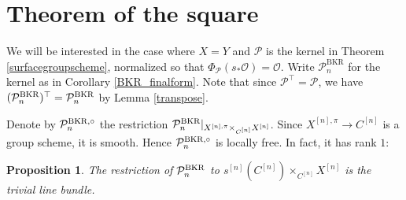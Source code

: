 \documentclass{amsart}
\theoremstyle{plain}
\newtheorem{proposition}[theorem]{Proposition}
\theoremstyle{definition}
\theoremstyle{remark}
\begin{document}
    \section{Theorem of the square}\label{ss:tots}
    We will be interested in the case where $X=Y$ and $\mathcal P$ is the kernel in Theorem \ref{surfacegroupscheme}, normalized so that $\Phi_{\mathcal P}(s_\ast\mathcal O)=\mathcal O$.
    Write $\mathcal P^{\operatorname{BKR}}_n$ for the kernel as in Corollary \ref{BKR_finalform}.
    Note that since $\mathcal P^\top=\mathcal P$, we have $(\mathcal P_n^{\rm BKR})^\top=\mathcal P_n^{\rm BKR}$ by Lemma \ref{transpose}.

    Denote by $\mathcal P^{\rm BKR,\circ}_n$ the restriction $\mathcal P^{\rm BKR}_n|_{X^{[n],\pi}\times_{C^{[n]}} X^{[n]}}$.
    Since $X^{[n],\pi}\to C^{[n]}$ is a group scheme, it is smooth.
    Hence $\mathcal P^{\rm BKR,\circ}_n$ is locally free.
    In fact, it has rank $1$:
    \begin{proposition}\label{section_BKR}
        The restriction of $\mathcal P^{\rm BKR}_n$ to $s^{[n]}(C^{[n]})\times_{C^{[n]}}X^{[n]}$ is the trivial line bundle.
    \end{proposition}
\end{document}
